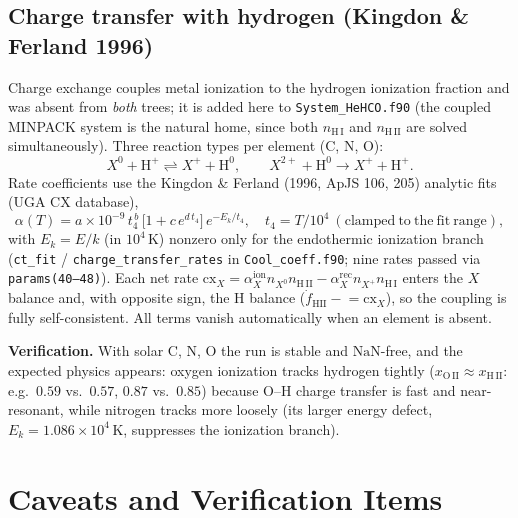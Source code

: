 \documentclass[english,a4paper]{kiseon_memo}
\begin{document}
\subsection{Charge transfer with hydrogen (Kingdon \& Ferland 1996)}
\label{sec:cx}

Charge exchange couples metal ionization to the hydrogen ionization
fraction and was absent from \emph{both} trees; it is added here to
\texttt{System\_HeHCO.f90} (the coupled MINPACK system is the natural
home, since both \(n_{\mathrm{H\,I}}\) and \(n_{\mathrm{H\,II}}\) are
solved simultaneously).  Three reaction types per element (C, N, O):
\[
  X^{0} + \mathrm{H^+} \rightleftharpoons X^{+} + \mathrm{H^0},
  \qquad
  X^{2+} + \mathrm{H^0} \rightarrow X^{+} + \mathrm{H^+}.
\]
Rate coefficients use the Kingdon \& Ferland (1996, ApJS 106, 205)
analytic fits (UGA CX database),
\[
  \alpha(T) = a\times10^{-9}\,t_4^{\,b}\,
  \bigl[1 + c\,e^{d\,t_4}\bigr]\,e^{-E_k/t_4},
  \quad t_4 = T/10^4\ \mathrm{(clamped\ to\ the\ fit\ range)},
\]
with \(E_k=E/k\) (in \(10^4\)\,K) nonzero only for the endothermic
ionization branch (\texttt{ct\_fit} / \texttt{charge\_transfer\_rates}
in \texttt{Cool\_coeff.f90}; nine rates passed via \texttt{params(40--48)}).
Each net rate
\(\mathrm{cx}_X = \alpha^{\mathrm{ion}}_X n_{X^0} n_{\mathrm{H\,II}}
 - \alpha^{\mathrm{rec}}_X n_{X^+} n_{\mathrm{H\,I}}\)
enters the \(X\) balance and, with opposite sign, the H balance
(\(\dot{f}_{\mathrm{HII}} \mathrel{-}= \mathrm{cx}_X\)), so the coupling
is fully self-consistent.  All terms vanish automatically when an
element is absent.

\textbf{Verification.}  With solar C, N, O the run is stable and
\(\mathrm{NaN}\)-free, and the expected physics appears: oxygen
ionization tracks hydrogen tightly (\(x_{\mathrm{O\,II}}\approx
x_{\mathrm{H\,II}}\): e.g.\ \(0.59\) vs.\ \(0.57\), \(0.87\) vs.\
\(0.85\)) because O--H charge transfer is fast and near-resonant, while
nitrogen tracks more loosely (its larger energy defect,
\(E_k=1.086\times10^4\)\,K, suppresses the ionization branch).

\section{Caveats and Verification Items}
\end{document}
